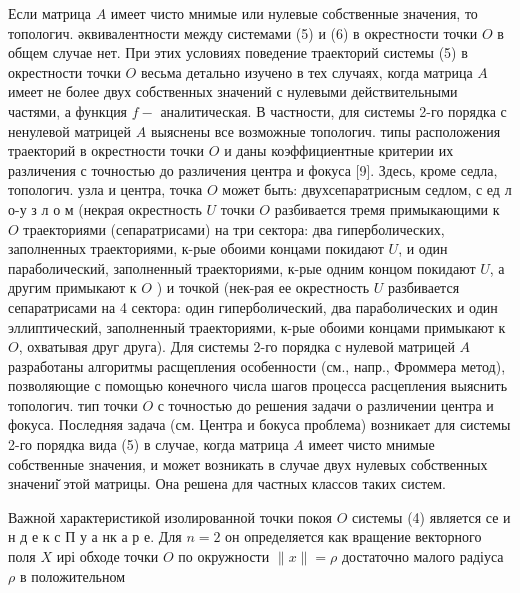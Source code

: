 \documentclass[10pt]{article}
\begin{document}
Если матрица $A$ имеет чисто мнимые или нулевые собственные значения, то топологич. әквивалентности между системами (5) и (6) в окрестности точки $O$ в общем случае нет. При этих условиях поведение траекторий системы (5) в окрестности точки $O$ весьма детально изучено в тех случаях, когда матрица $A$ имеет не более двух собственных значений с нулевыми действительными частями, а функция $f-$ аналитическая. В частности, для системы 2-го порядка с ненулевой матрицей $A$ выяснены все возможные топологич. типы расположения траекторий в окрестности точки $O$ и даны коэффициентные критерии их различения с точностью до различения центра и фокуса [9]. Здесь, кроме седла, топологич. узла и центра, точка $O$ может быть: двухсепаратрисным седлом, с ед л о-у з л о м (некрая окрестность $U$ точки $O$ разбивается тремя примыкающими к $O$ траекториями (сепаратрисами) на три сектора: два гиперболических, заполненных траекториями, к-рые обоими концами покидают $U$, и один параболический, заполненный траекториями, к-рые одним концом покидают $U$, а другим примыкают к $O$ ) и точкой (нек-рая ее окрестность $U$ разбивается сепаратрисами на 4 сектора: один гиперболический, два параболических и один эллиптический, заполненный траекториями, к-рые обоими концами примыкают к $O$, охватывая друг друга). Для системы 2-го порядка с нулевой матрицей $A$ разработаны алгоритмы расщепления особенности (см., напр., Фроммера метод), позволяющие с помощью конечного числа шагов процесса расцепления выяснить топологич. тип точки $O$ с точностью до решения задачи о различении центра и фокуса. Последняя задача (см. Центра и бокуса проблема) возникает для системы 2-го порядка вида (5) в случае, когда матрица $A$ имеет чисто мнимые собственные значения, и может возникать в случае двух нулевых собственных значениі̆ этой матрицы. Она решена для частных классов таких систем.



Важной характеристикой изолированной точки покоя $O$ системы (4) является се и н д е к с П у а нк а р е. Для $n=2$ он определяется как вращение векторного поля $X$ ирі обходе точки $O$ по окружности $\|x\|=\rho$ достаточно малого радіуса $\rho$ в положительном
\end{document}
